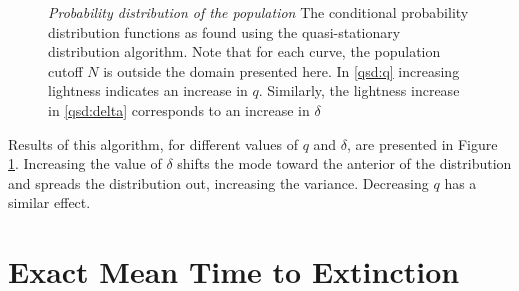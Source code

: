\documentclass[a4paper,10pt]{article}
\numberwithin{equation}{section} %
\begin{document}
\begin{figure}[ht!]
  \centering
  \hfill
  \caption{\emph{Probability distribution of the population} The conditional probability distribution functions as found using the quasi-stationary distribution algorithm. Note that for each curve, the population cutoff $N$ is outside the domain presented here. In \ref{qsd:q} increasing lightness indicates an increase in $q$. Similarly, the lightness increase in \ref{qsd:delta} corresponds to an increase in $\delta$}
  \label{qsd}
\end{figure}

Results of this algorithm, for different values of $q$ and $\delta$, are presented in Figure \ref{qsd}. 
Increasing the value of $\delta$ shifts the mode toward the anterior of the distribution and spreads the distribution out, increasing the variance. 
Decreasing $q$ has a similar effect. %








\section{Exact Mean Time to Extinction}%
\end{document}
